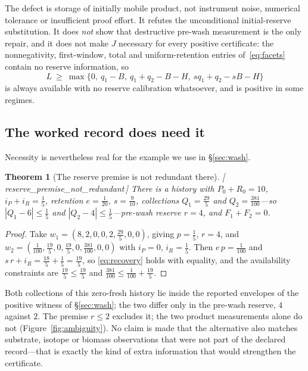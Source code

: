 \documentclass[11pt]{article}
\theoremstyle{plain}
\newtheorem{theorem}{Theorem}[section]
\theoremstyle{definition}
\theoremstyle{remark}
\newcommand{\leanref}[1]{{\normalfont\sffamily\footnotesize[\,#1\,]}}
\newcommand{\Lc}{L}
\begin{document}
The defect is storage of initially mobile product, not instrument noise,
numerical tolerance or insufficient proof effort. It refutes the
unconditional initial-reserve substitution. It does \emph{not} show that
destructive pre-wash measurement is the only repair, and it does not make $J$
necessary for every positive certificate: the nonnegativity, first-window,
total and uniform-retention entries of~\eqref{eq:facets} contain no reserve
information, so
\[
 \Lc\ \ge\ \max\{0,\ q_1-B,\ q_1+q_2-B-H,\ s q_1+q_2-sB-H\}
\]
is always available with no reserve calibration whatsoever, and is positive in
some regimes.

\subsection{The worked record does need it}

Necessity is nevertheless real for the example we use in \S\ref{sec:wash}.

\begin{theorem}[The reserve premise is not redundant there]
\label{thm:ambiguity}
\leanref{reserve\_premise\_not\_redundant}
There is a history with $P_0+R_0=10$, $i_P+i_R=\tfrac15$, retention
$e=\tfrac1{20}$, $s=\tfrac9{10}$, collections
$Q_1=\tfrac{29}5$ and $Q_2=\tfrac{381}{100}$---so
$|Q_1-6|\le\tfrac15$ and $|Q_2-4|\le\tfrac15$---pre-wash reserve $r=4$, and
$F_1+F_2=0$.
\end{theorem}

\begin{proof}
Take $w_1=(8,2,0,0,2,\tfrac{29}5,0,0)$, giving $p=\tfrac15$, $r=4$, and
$w_2=(\tfrac1{100},\tfrac{19}5,0,\tfrac{19}5,0,\tfrac{381}{100},0,0)$ with
$i_P=0$, $i_R=\tfrac15$. Then
$e\,p=\tfrac1{100}$ and $s\,r+i_R=\tfrac{18}5+\tfrac15=\tfrac{19}5$, so
\eqref{eq:recovery} holds with equality, and the availability constraints are
$\tfrac{19}5\le\tfrac{19}5$ and
$\tfrac{381}{100}\le\tfrac1{100}+\tfrac{19}5$.
\end{proof}

Both collections of this zero-fresh history lie inside the reported envelopes
of the positive witness of \S\ref{sec:wash}; the two differ only in the
pre-wash reserve, $4$ against $2$. The premise $r\le2$ excludes it; the two
product measurements alone do not (Figure~\ref{fig:ambiguity}). No claim is
made that the alternative also matches substrate, isotope or biomass
observations that were not part of the declared record---that is exactly the
kind of extra information that would strengthen the certificate.
\end{document}
